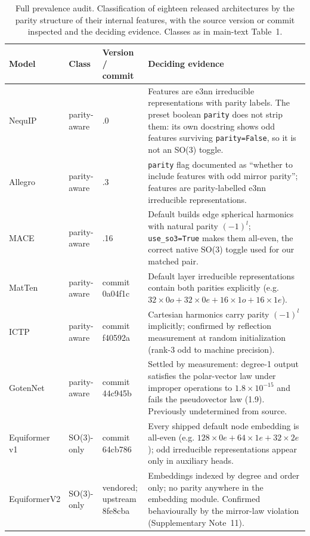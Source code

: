 \begin{table}[htbp]
\centering
\caption{Full prevalence audit. Classification of eighteen released architectures by the parity structure of their internal features, with the source version or commit inspected and the deciding evidence. Classes as in main-text Table~1.}
\label{stab:audit}
\fontsize{7bp}{8.5bp}\selectfont
\begin{tabular}{@{}>{\raggedright\arraybackslash}p{2.2cm} l >{\raggedright\arraybackslash}p{1.9cm} >{\raggedright\arraybackslash}p{6.0cm}@{}}
\toprule
Model & Class & Version / commit & Deciding evidence \\
\midrule
NequIP & parity-aware & 0.18.0 & Features are e3nn irreducible representations with parity labels. The preset boolean \texttt{parity} does not strip them: its own docstring shows odd features surviving \texttt{parity=False}, so it is not an SO(3) toggle. \\
Allegro & parity-aware & 0.8.3 & \texttt{parity} flag documented as ``whether to include features with odd mirror parity''; features are parity-labelled e3nn irreducible representations. \\
MACE & parity-aware & 0.3.16 & Default builds edge spherical harmonics with natural parity $(-1)^l$; \texttt{use\_so3=True} makes them all-even, the correct native SO(3) toggle used for our matched pair. \\
MatTen\cite{wen2024matten} & parity-aware & commit 0a04f1c & Default layer irreducible representations contain both parities explicitly (e.g. $32\times0o + 32\times0e + 16\times1o + 16\times1e$). \\
ICTP\cite{zaverkin2024ictp} & parity-aware & commit f40592a & Cartesian harmonics carry parity $(-1)^l$ implicitly; confirmed by reflection measurement at random initialization (rank-3 odd to machine precision). \\
GotenNet\cite{aykent2025gotennet} & parity-aware & commit 44c945b & Settled by measurement: degree-1 output satisfies the polar-vector law under improper operations to $1.8\times10^{-15}$ and fails the pseudovector law (1.9). Previously undetermined from source. \\
\midrule
Equiformer v1 & SO(3)-only & commit 64cb786 & Every shipped default node embedding is all-even (e.g. $128\times0e+64\times1e+32\times2e$); odd irreducible representations appear only in auxiliary heads. \\
EquiformerV2 & SO(3)-only & vendored; upstream 8fe8cba & Embeddings indexed by degree and order only; no parity anywhere in the embedding module. Confirmed behaviourally by the mirror-law violation (Supplementary Note~11). \\

\end{tabular}
\end{table}
